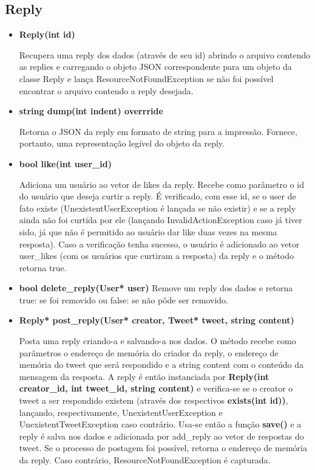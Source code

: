 \documentclass[a4paper]{article}
\begin{document}
\subsection{Reply}
\begin{itemize}
    \item \textbf{Reply(int id)}

    Recupera uma reply dos dados (através de seu id) abrindo o arquivo contendo as replies e carregando o objeto JSON correspondente para um objeto da classe Reply e lança ResourceNotFoundException se não foi possível encontrar o arquivo contendo a reply desejada.

    \item \textbf{string dump(int indent) overrride}

    Retorna o JSON da reply em formato de string para a impressão. Fornece, portanto, uma representação legível do objeto da reply.

    \item \textbf{bool like(int user\_id)}

    Adiciona um usuário ao vetor de likes da reply. Recebe como parâmetro o id do usuário que deseja curtir a reply. É verificado, com esse id, se o user de fato existe (UnexistentUserException é lançada se não existir) e se a reply ainda não foi curtida por ele (lançando InvalidActionException caso já tiver sido, já que não é permitido ao usuário dar like duas vezes na mesma resposta). Caso a verificação tenha sucesso, o usuário é adicionado ao vetor user\_likes (com os usuários que curtiram a resposta) da reply  e o método retorna true.

    \item \textbf{bool delete_reply(User* user)}
    Remove um reply dos dados e retorna true: se foi removido ou false: se não pôde ser removido.

    \item \textbf{Reply* post\_reply(User* creator, Tweet* tweet, string content)}

    Posta uma reply criando-a e salvando-a nos dados. O método recebe como parâmetros o endereço de memória do criador da reply, o endereço de memória do tweet que será respondido e a string content com o conteúdo da mensagem da resposta. A reply é então instanciada por \textbf{Reply(int creator\_id, int tweet\_id, string content)} e verifica-se se o creator o tweet a ser respondido existem (através dos respectivos \textbf{exists(int id))}, lançando, respectivamente, UnexistentUserException e UnexistentTweetException caso contrário. Usa-se então a função \textbf{save()} e a reply é salva nos dados e adicionada por add\_reply ao vetor de respostas do tweet. Se o processo de postagem foi possível, retorna o endereço de memória da reply. Caso contrário, ResourceNotFoundException é capturada.

\end{itemize}
\end{document}
